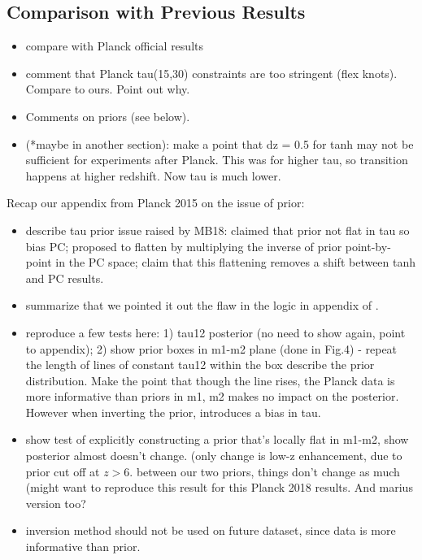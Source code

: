 \documentclass[prd,twocolumn,amsmath,amssymb,floatfix,superscriptaddress,nofootinbib]{revtex4-1}
\begin{document}
\subsection{Comparison with Previous Results}

\begin{itemize}
    \item compare with Planck official results
    \item comment that Planck tau(15,30) constraints are too stringent (flex knots). Compare to ours. Point out why.
    \item{ Comments on priors (see below).}
    \item (*maybe in  another section): make a point that dz = 0.5 for tanh may not be sufficient for experiments after Planck. This was for higher tau, so transition happens at higher redshift. Now tau is much lower.
\end{itemize}


Recap our appendix from Planck 2015 on the issue of prior:
\begin{itemize}
    \item {describe tau prior issue raised by MB18: claimed that prior not flat in tau so bias PC; proposed to flatten by multiplying the inverse of prior point-by-point in the PC space; claim that this flattening removes a shift between tanh and PC results. }
    \item {summarize that we pointed it out the flaw in the logic in appendix of \cite{Heinrich:2018btc}.}
    \item{reproduce a few tests here: 1) tau12 posterior (no need to show again, point to appendix); 2) show prior boxes in m1-m2 plane (done in Fig.4) - repeat the length of lines of constant tau12 within the box describe the prior distribution. Make the point that though the line rises, the Planck data is more informative than priors in m1, m2 makes no impact on the posterior. However when inverting the prior, introduces a bias in tau.}
    \item{show test of explicitly constructing a prior that's locally flat in m1-m2, show posterior almost doesn't change. (only change is low-z enhancement, due to prior cut off at $z>6$. between our two priors, things don't change as much (might want to reproduce this result for this Planck 2018 results. And marius version too?}
    \item{inversion method should not be used on future dataset, since data is more informative than prior.}
\end{itemize}
\end{document}
